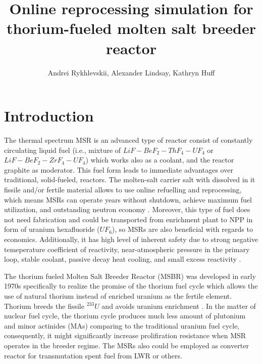 \documentclass{anstrans}
\title{Online reprocessing simulation for thorium-fueled molten salt breeder reactor}
\author{Andrei Rykhlevskii, Alexander Lindsay, Kathryn Huff}
\institute{
Department of Nuclear, Plasma, and Radiological Engineering, University of Illinois at Urbana-Champaign \break
Urbana, IL
}
\begin{document}
\section{Introduction}
The thermal spectrum \gls{MSR} is an advanced type of reactor consist of constantly circulating liquid fuel (i.e., mixture of $LiF-BeF_2-ThF_4-UF_4$ or $LiF-BeF_2-ZrF_4-UF_4$) which works also as a coolant, and the reactor graphite as moderator. This fuel form leads to immediate advantages over traditional, solid-fueled, reactors. The molten-salt carrier salt with dissolved in it fissile and/or fertile material allows to use online refuelling and reprocessing, which means \gls{MSR}s can operate years without shutdown, achieve maximum fuel utilization, and outstanding neutron economy \cite{leblanc_molten_2010}. Moreover, this type of fuel does not need fabrication and could be transported from enrichment plant to \gls{NPP} in form of uranium hexafluoride ($UF_6$), so \gls{MSR}s are also beneficial with regards to economics. Additionally, it has high level of inherent safety due to strong negative temeperature coefficient of reactivity, near-atmospheric pressure in the primary loop, stable coolant, passive decay heat cooling, and small excess reactivity \cite{elsheikh_safety_2013}.

The thorium fueled Molten Salt Breeder Reactor (MSBR) was developed in early 1970s specifically to realize the promise of the thorium fuel cycle which allows the use of natural thorium instead of enriched uranium as the fertile element. Thorium breeds the fissile $^{233}U$ and avoids uranium enrichment \cite{robertson_conceptual_1971}. In the matter of nuclear fuel cycle, the thorium cycle produces much less amount of plutonium and minor actinides (MAs) comparing to the traditional uranium fuel cycle, consequently, it might significantly increase prolifiration resistance when \gls{MSR} operates in the breeder regime. The \gls{MSR}s also could be employed as converter reactor for transmutation spent fuel from \gls{LWR} or others.
\end{document}
